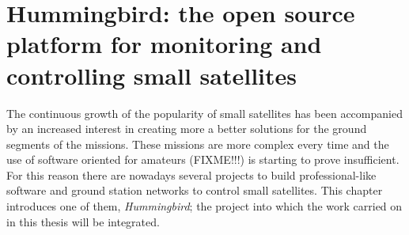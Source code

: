 
\chapter{Hummingbird: the open source platform for monitoring and controlling small satellites}\label{chapter3}

The continuous growth of the popularity of small satellites has been accompanied by an increased interest in creating more a better solutions for the ground segments of the missions. These missions are more complex every time and the use of software oriented for amateurs (FIXME!!!) is starting to prove insufficient. For this reason there are nowadays several projects to build professional-like software and ground station networks to control small satellites. This chapter introduces one of them, \emph{Hummingbird}; the project into which the work carried on in this thesis will be integrated. 


\newpage
